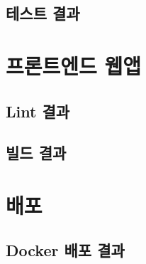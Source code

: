 \documentclass[12pt]{article}
\begin{document}
\subsection{테스트 결과}



\newpage




\section{프론트엔드 웹앱}

\newpage

\subsection{Lint 결과}



\subsection{빌드 결과}



\newpage




\section{배포}

\subsection{Docker 배포 결과}



\newpage

\end{document}
